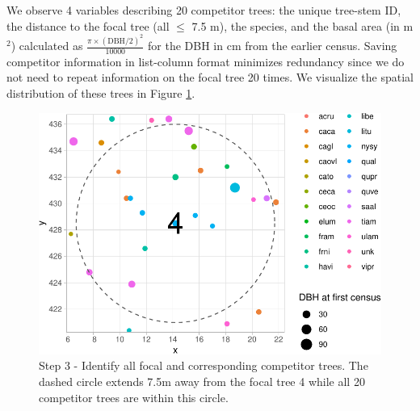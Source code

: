 \documentclass[12pt]{article}
\newenvironment{Shaded}{\begin{snugshade}}{\end{snugshade}}
\newcommand{\CommentTok}[1]{\textcolor[rgb]{0.56,0.35,0.01}{\textit{#1}}}
\newcommand{\DataTypeTok}[1]{\textcolor[rgb]{0.13,0.29,0.53}{#1}}
\newcommand{\DecValTok}[1]{\textcolor[rgb]{0.00,0.00,0.81}{#1}}
\newcommand{\KeywordTok}[1]{\textcolor[rgb]{0.13,0.29,0.53}{\textbf{#1}}}
\newcommand{\NormalTok}[1]{#1}
\newcommand{\OperatorTok}[1]{\textcolor[rgb]{0.81,0.36,0.00}{\textbf{#1}}}
\newcommand{\StringTok}[1]{\textcolor[rgb]{0.31,0.60,0.02}{#1}}
\begin{document}
\begin{Shaded}
\end{Shaded}

We observe 4 variables describing 20 competitor trees: the unique
tree-stem ID, the distance to the focal tree (all \(\leq\) 7.5 m), the
species, and the basal area (in m\(^2\)) calculated as
\(\frac{\pi \times (\text{DBH/2})^2}{10000}\) for the DBH in cm from the
earlier census. Saving competitor information in list-column format
minimizes redundancy since we do not need to repeat information on the
focal tree 20 times. We visualize the spatial distribution of these
trees in Figure \ref{fig:scbi-focal-vs-comp-map}.

\begin{figure}

{\centering \includegraphics[width=0.66\linewidth]{Figures/scbi-focal-vs-comp-map-1} 

}

\caption{Step 3 - Identify all focal and corresponding competitor trees. The dashed circle extends 7.5m away from the focal tree 4 while all 20 competitor trees are within this circle.}\label{fig:scbi-focal-vs-comp-map}
\end{figure}
\end{document}
